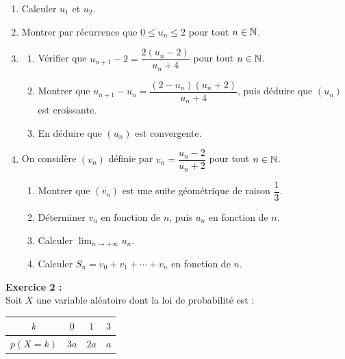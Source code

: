 \begin{enumerate}[leftmargin=1.5em, label=\textbf{\arabic*)}, itemsep=2pt, topsep=4pt]
  \item Calculer $u_1$ et $u_2$.
  \item Montrer par r\'{e}currence que $0 \leq u_n \leq 2$ pour tout $n \in \mathbb{N}$.
  \item
    \begin{enumerate}[label=\textbf{\alph*)}, itemsep=1pt, topsep=1pt]
      \item V\'{e}rifier que $u_{n+1} - 2 = \dfrac{2(u_n - 2)}{u_n + 4}$ pour tout $n \in \mathbb{N}$.
      \item Montrer que $u_{n+1} - u_n = \dfrac{(2 - u_n)(u_n + 2)}{u_n + 4}$,
            puis d\'{e}duire que $(u_n)$ est croissante.
      \item En d\'{e}duire que $(u_n)$ est convergente.
    \end{enumerate}
  \item On consid\`{e}re $(v_n)$ d\'{e}finie par $v_n = \dfrac{u_n - 2}{u_n + 2}$ pour tout $n \in \mathbb{N}$.
    \begin{enumerate}[label=\textbf{\alph*)}, itemsep=1pt, topsep=1pt]
      \item Montrer que $(v_n)$ est une suite g\'{e}om\'{e}trique de raison $\dfrac{1}{3}$.
      \item D\'{e}terminer $v_n$ en fonction de $n$, puis $u_n$ en fonction de $n$.
      \item Calculer $\displaystyle\lim_{n \to +\infty} u_n$.
      \item Calculer $S_n = v_0 + v_1 + \cdots + v_n$ en fonction de $n$.
    \end{enumerate}
\end{enumerate}

\medskip

\noindent\textbf{Exercice 2 :}\\
Soit $X$ une variable al\'{e}atoire dont la loi de probabilit\'{e} est :

\medskip
\begin{center}
\renewcommand{\arraystretch}{1.4}
\begin{tabular}{|c|c|c|c|}
  \hline
  \rowcolor{navylight}
  \textbf{\color{navy}$k$} & $0$ & $1$ & $3$ \\
  \hline
  \textbf{\color{navy}$p(X=k)$} & $3a$ & $2a$ & $a$ \\
  \hline
\end{tabular}
\end{center}
\medskip

